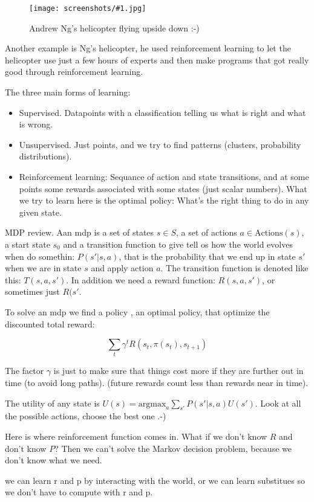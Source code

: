 \documentclass[a4, 12pt, english, USenglish]{scrreprt}
\newcommand{\screenshot}[2]{
\begin{figure}[htb]
\texttt{[image: screenshots/\#1.jpg]}
\label{#1}
\caption{#2}
\end{figure}}
\begin{document}
\screenshot{NGshelicopter}{Andrew Ng's helicopter flying upside down :-)}

Another example is Ng's helicopter, he used reinforcement learning
to let the helicopter use just a few hours of experts and then make
programs that got really good through reinforcement learning.

The three main forms of learning:

\begin{itemize}
\item Supervised. Datapoints with a classification telling us what is  right and what is wrong.
\item Unsupervised.  Just points, and we try to find patterns
  (clusters, probability distributions).
\item Reinforcement learning: Sequance of action and state
  transitions, and at some points some rewards associated with some
  states (just scalar numbers).  What we try to learn here is the
  optimal policy: What's the right thing to do in any given state.
\end{itemize}


MDP review. Aan mdp is a set of states \(s\in S\), a set of actions
\(a\in\mbox{Actions}(s)\), a start state \(s_0\) and a transition
function to give tell os how the world evolves when do somethin:
\(P(s' |s,a)\), that is the probability that we end up in state \(s'\)
when we are in state \(s\) and apply action \(a\).  The transition
function is denoted like this: \(T(s,a,s')\).  In addition we need a
reward function: \(R(s,a,s')\), or sometimes just \(R(s'\).

To solve an mdp we find a policy , an optimal policy, that optimize
the discounted total reward:

\[
  \sum_t   \gamma^tR(s_t, \pi(s_t), s_{t+1})
\]

The factor \(\gamma\) is just to make sure that things cost more if
they are further out in time (to avoid long paths). (future rewards
count less than rewards near in time).

The utility of any state is \(U(s) = \mbox{argmax}_a \sum_{s'}
P(s'|s,a) U(s') \).  Look at all the possible actions, choose the best
one .-)


Here is where reinforcement function comes in.  What if we don't know
\(R\) and don't know \(P\)? Then we can't solve the Markov decision
problem, because we don't know what we need.

we can learn r and p by interacting with the world, or we can learn
substitues so we don't have to compute with r and p.
\end{document}
